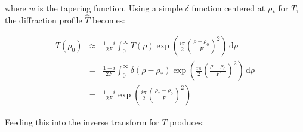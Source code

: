 \documentclass{article}
\begin{document}
    where $w$ is the tapering function. Using a simple $\delta$ function
    centered at $\rho_{*}$ for $T$, the diffraction profile $\hat{T}$ becomes:

    \begin{equation}
        \begin{array}{rcl}
            \displaystyle
            \hat{T}(\rho_{0})
            \!\!
            &\approx&
            \!\!
            \displaystyle
            \frac{1-i}{2F}
            \int_{0}^{\infty}
                T(\rho)
                \exp\left(
                    \frac{i\pi}{2}\left(
                        \frac{\rho-\rho_{0}}{F}
                    \right)^{2}
                \right)\,\textrm{d}\rho\\[1.5em]
            \!\!
            &=&
            \!\!
            \displaystyle
            \frac{1-i}{2F}
            \int_{0}^{\infty}
                \delta(\rho-\rho_{*})
                \exp\left(
                    \frac{i\pi}{2}\left(
                        \frac{\rho-\rho_{0}}{F}
                    \right)^{2}
                \right)\,\textrm{d}\rho\\[1.5em]
            \!\!
            &=&
            \!\!
            \displaystyle
            \frac{1-i}{2F}
            \exp\left(
                \frac{i\pi}{2}\left(
                    \frac{\rho_{*}-\rho_{0}}{F}
                \right)^{2}
            \right)
        \end{array}
    \end{equation}

    Feeding this into the inverse transform for $T$ produces:
\end{document}
